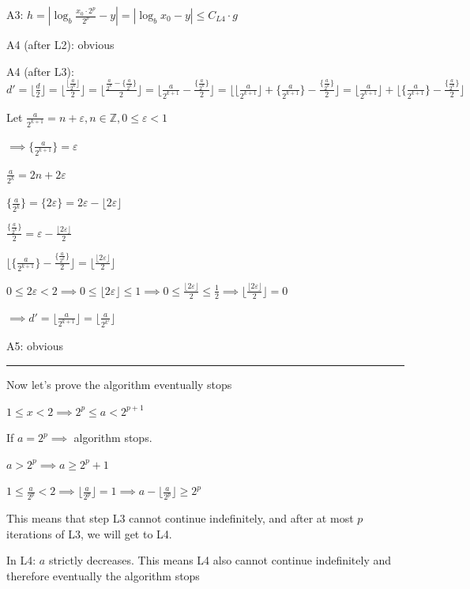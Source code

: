 \documentclass{article}
\begin{document}
A3: \( h = |\log_{b}\frac{x_{0}\cdot2^{p}}{2^{p}} - y| = |\log_b{x_{0}} - y| \leq C_{L4} \cdot g \)

A4 (after L2): obvious

A4 (after L3): \( d' = \lfloor\frac{d}{2}\rfloor = \lfloor\frac{\lfloor\frac{a}{2^{k}}\rfloor}{2}\rfloor = \lfloor\frac{\frac{a}{2^{k}} - \{\frac{a}{2^{k}}\}}{2}\rfloor = \lfloor\frac{a}{2^{k+1}} - \frac{\{\frac{a}{2^{k}}\}}{2}\rfloor = \lfloor\lfloor\frac{a}{2^{k+1}}\rfloor + \{\frac{a}{2^{k+1}}\} - \frac{\{\frac{a}{2^{k}}\}}{2}\rfloor = \lfloor\frac{a}{2^{k+1}}\rfloor + \lfloor \{\frac{a}{2^{k+1}}\} - \frac{\{\frac{a}{2^{k}}\}}{2}\rfloor \)

Let \( \frac{a}{2^{k+1}} = n + \varepsilon, n \in \mathbb{Z}, 0 \leq \varepsilon < 1 \)

\( \implies \{\frac{a}{2^{k+1}}\} = \varepsilon \)

\( \frac{a}{2^{k}} = 2n + 2\varepsilon \)

\( \{\frac{a}{2^{k}}\} = \{ 2\varepsilon \} = 2\varepsilon - \lfloor2\varepsilon\rfloor \)

\( \frac{\{\frac{a}{2^{k}}\}}{2} = \varepsilon - \frac{\lfloor2 \varepsilon\rfloor}{2} \)

\( \lfloor \{\frac{a}{2^{k+1}}\} - \frac{\{\frac{a}{2^{k}}\}}{2}\rfloor = \lfloor\frac{\lfloor2\varepsilon\rfloor}{2}\rfloor \)

\( 0 \leq 2\varepsilon < 2 \implies 0 \leq \lfloor2\varepsilon\rfloor \leq 1 \implies 0 \leq \frac{\lfloor2\varepsilon\rfloor}{2} \leq \frac{1}{2} \implies \lfloor\frac{\lfloor2\varepsilon\rfloor}{2}\rfloor = 0 \)

\( \implies d' = \lfloor\frac{a}{2^{k+1}}\rfloor = \lfloor\frac{a}{2^{k'}}\rfloor \)

A5: obvious

\bigskip\hrule\bigskip

Now let's prove the algorithm eventually stops

\( 1 \leq x < 2 \implies 2^{p} \leq a < 2^{p+1} \)

If \( a = 2^{p} \implies \) algorithm stops.

\( a > 2^{p} \implies a \geq 2^{p} + 1 \)

\( 1 \leq \frac{a}{2^{p}} < 2 \implies \lfloor\frac{a}{2^{p}}\rfloor = 1 \implies a - \lfloor\frac{a}{2^{p}}\rfloor \geq 2^{p} \)

This means that step L3 cannot continue indefinitely, and after at most \( p \) iterations of L3, we will get to L4.

In L4: \( a \) strictly decreases. This means L4 also cannot continue indefinitely and therefore eventually the algorithm stops
\end{document}
